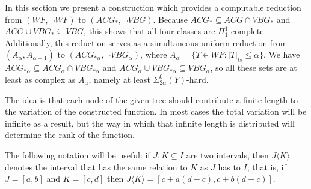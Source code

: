 \documentclass[12pt]{amsart}
\begin{document}
In this section we present a construction which provides a 
computable reduction from $(WF, \neg WF)$ to $(ACG_\ast, \neg VBG)$.  
Because $ACG_\ast \subseteq ACG \cap VBG_\ast$ and 
$ACG \cup VBG_\ast \subseteq VBG$, 
this shows that all four classes are $\Pi^1_1$-complete.  Additionally, 
this reduction serves as a simultaneous uniform reduction from 
$(A_\alpha, A_{\alpha + 1})$ to $(ACG_{\ast\alpha}, \neg VBG_\alpha)$,
where $A_\alpha = \{T \in WF : |T|_{ls} \leq\alpha\}$.
We have $ACG_{\ast\alpha} \subseteq ACG_\alpha \cap VBG_{\ast\alpha}$ and 
$ACG_\alpha \cup VBG_{\ast\alpha} \subseteq VBG_\alpha$, so all these 
sets are at least as complex as $A_\alpha$, namely at least 
$\Sigma^0_{2\alpha}(Y)$-hard.

The idea is that each node of the given tree should contribute a finite length to the variation of the constructed function.  In most cases the total variation will be infinite as a result, but the way in which that infinite length is distributed will determine the rank of the function.

The following notation will be useful: if $J,K\subseteq I$ are two intervals, 
then $J\langle K\rangle$ 
denotes the interval that has the same relation to $K$ as 
$J$ has to $I$; that is, if $J = [a,b]$ and $K = [c,d]$ then 
$J\langle K\rangle = [c+a(d-c), c+b(d-c)]$.
\end{document}

